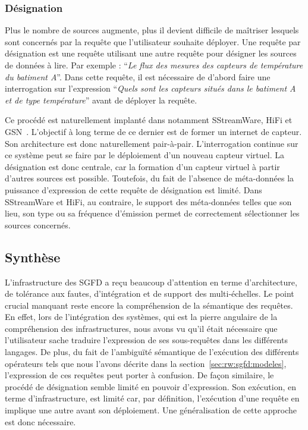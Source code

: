 \subsubsection{Désignation}\label{sec:rw:sgfd:infra:designation}
Plus le nombre de sources augmente, plus il devient difficile de maîtriser lesquels sont concernés par la requête que l'utilisateur souhaite déployer. Une requête par désignation est une requête utilisant une autre requête pour désigner les sources de données à lire. Par exemple : \enquote{\it Le flux des mesures des capteurs de température du batiment A}. Dans cette requête, il est nécessaire de d'abord faire une interrogation sur l'expression \enquote{\it Quels sont les capteurs situés dans le batiment \textit{A} et de type \textit{température}} avant de déployer la requête.

Ce procédé est naturellement implanté dans notamment SStreamWare, HiFi et GSN~\cite{Aberer:gsn}. L’objectif à long terme de ce dernier est de former un internet de capteur. Son architecture est donc naturellement pair-à-pair. L’interrogation continue sur ce système peut se faire par le déploiement d’un nouveau capteur virtuel. La désignation est donc centrale, car la formation d’un capteur virtuel à partir d’autres sources est possible. Toutefois, du fait de l’absence de méta-données la puissance d'expression de cette requête de désignation est limité. Dans SStreamWare et HiFi, au contraire, le support des méta-données telles que son lieu, son type ou sa fréquence d'émission permet de correctement sélectionner les sources concernés.

\subsection{Synthèse}
L'infrastructure des SGFD a reçu beaucoup d'attention en terme d'architecture, de tolérance aux fautes, d'intégration et de support des multi-échelles. Le point crucial manquant reste encore la compréhension de la sémantique des requêtes. En effet, lors de l'intégration des systèmes, qui est la pierre angulaire de la compréhension des infrastructures, nous avons vu qu'il était nécessaire que l'utilisateur sache traduire l'expression de ses sous-requêtes dans les différents langages. De plus, du fait de l'ambiguïté sémantique de l'exécution des différents opérateurs tels que nous l'avons décrite dans la section~\ref{sec:rw:sgfd:modeles}, l'expression de ces requêtes peut porter à confusion. De façon similaire, le procédé de désignation semble limité en pouvoir d'expression. Son exécution, en terme d'infrastructure, est limité car, par définition, l'exécution d'une requête en implique une autre avant son déploiement. Une généralisation de cette approche est donc nécessaire.
